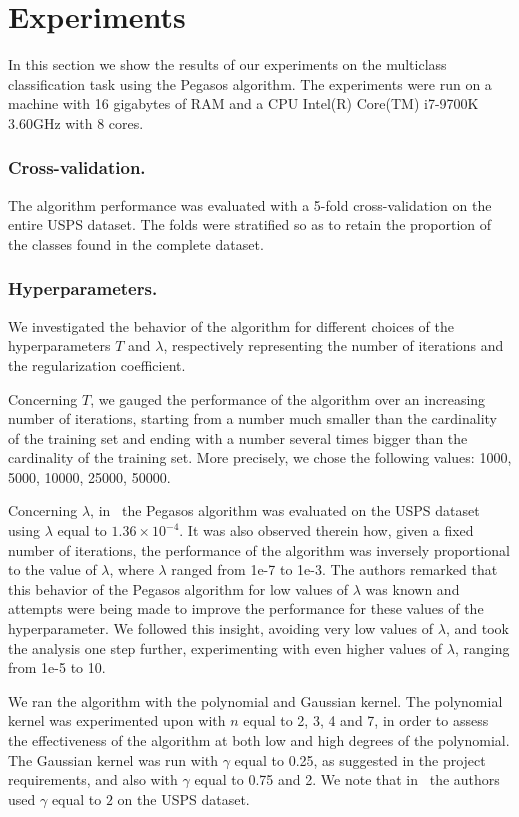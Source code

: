 \documentclass[runningheads]{llncs}
\begin{document}
\section{Experiments}
\label{sec:experiments}

In this section we show the results of our experiments on the multiclass classification task using the Pegasos algorithm. The experiments were run on a machine with 16 gigabytes of RAM and a CPU Intel(R) Core(TM) i7-9700K 3.60GHz with 8 cores.

\subsubsection{Cross-validation.} The algorithm performance was evaluated with a 5-fold cross-validation on the entire USPS dataset. The folds were stratified so as to retain the proportion of the classes found in the complete dataset.

\subsubsection{Hyperparameters.} We investigated the behavior of the algorithm for different choices of the hyperparameters $T$ and $\lambda$, respectively representing the number of iterations and the regularization coefficient.

Concerning $T$, we gauged the performance of the algorithm over an increasing number of iterations, starting from a number much smaller than the cardinality of the training set and ending with a number several times bigger than the cardinality of the training set. More precisely, we chose the following values: 1000, 5000, 10000, 25000, 50000.

Concerning $\lambda$, in~\cite{shalev-pegasos-2011} the Pegasos algorithm was evaluated on the USPS dataset using $\lambda$ equal to $1.36 \times 10^{-4}$. It was also observed therein how, given a fixed number of iterations, the performance of the algorithm was inversely proportional to the value of $\lambda$, where $\lambda$ ranged from 1e-7 to 1e-3. The authors remarked that this behavior of the Pegasos algorithm for low values of $\lambda$ was known and attempts were being made to improve the performance for these values of the hyperparameter. We followed this insight, avoiding very low values of $\lambda$, and took the analysis one step further, experimenting with even higher values of $\lambda$, ranging from 1e-5 to 10.

We ran the algorithm with the polynomial and Gaussian kernel. The polynomial kernel was experimented upon with $n$ equal to 2, 3, 4 and 7, in order to assess the effectiveness of the algorithm at both low and high degrees of the polynomial. The Gaussian kernel was run with $\gamma$ equal to 0.25, as suggested in the project requirements, and also with $\gamma$ equal to 0.75 and 2. We note that in~\cite{shalev-pegasos-2011} the authors used $\gamma$ equal to $2$ on the USPS dataset.
\end{document}
